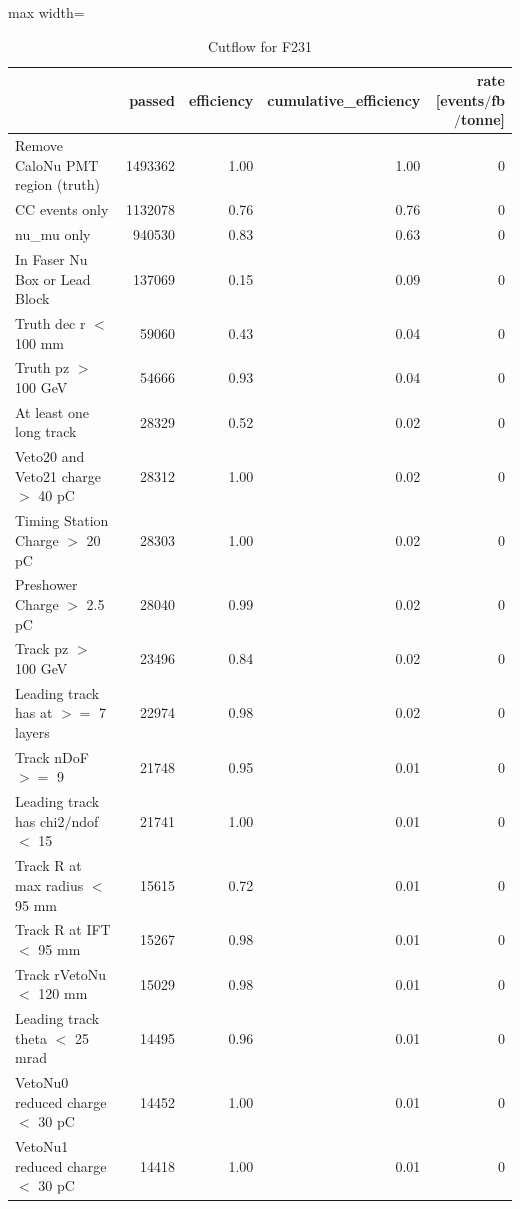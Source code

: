 \documentclass{article}
\begin{document}
\begin{table}
\centering
\caption{Cutflow for F231}
\begin{adjustbox}{max width=\textwidth}
\begin{tabular}{lrrrr}
\toprule
 & passed & efficiency & cumulative\_efficiency & rate [events$/$fb$/$tonne] \\
\midrule
Remove CaloNu PMT region (truth) & 1493362 & 1.00 & 1.00 & 0 \\
CC events only & 1132078 & 0.76 & 0.76 & 0 \\
nu\_mu only & 940530 & 0.83 & 0.63 & 0 \\
In Faser Nu Box or Lead Block & 137069 & 0.15 & 0.09 & 0 \\
Truth dec r $<$ 100 mm & 59060 & 0.43 & 0.04 & 0 \\
Truth pz $>$ 100 GeV & 54666 & 0.93 & 0.04 & 0 \\
At least one long track & 28329 & 0.52 & 0.02 & 0 \\
Veto20 and Veto21 charge $>$ 40 pC & 28312 & 1.00 & 0.02 & 0 \\
Timing Station Charge $>$ 20 pC & 28303 & 1.00 & 0.02 & 0 \\
Preshower Charge $>$ 2.5 pC & 28040 & 0.99 & 0.02 & 0 \\
Track pz $>$ 100 GeV & 23496 & 0.84 & 0.02 & 0 \\
Leading track has at $>$$=$ 7 layers & 22974 & 0.98 & 0.02 & 0 \\
Track nDoF $>$$=$ 9 & 21748 & 0.95 & 0.01 & 0 \\
Leading track has chi2$/$ndof $<$ 15 & 21741 & 1.00 & 0.01 & 0 \\
Track R at max radius $<$ 95 mm & 15615 & 0.72 & 0.01 & 0 \\
Track R at IFT $<$ 95 mm & 15267 & 0.98 & 0.01 & 0 \\
Track rVetoNu $<$ 120 mm & 15029 & 0.98 & 0.01 & 0 \\
Leading track theta $<$ 25 mrad & 14495 & 0.96 & 0.01 & 0 \\
VetoNu0 reduced charge $<$ 30 pC & 14452 & 1.00 & 0.01 & 0 \\
VetoNu1 reduced charge $<$ 30 pC & 14418 & 1.00 & 0.01 & 0 \\
\bottomrule
\end{tabular}

\end{adjustbox}
\end{table}
\end{document}
